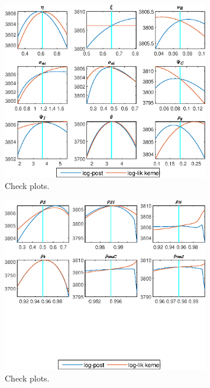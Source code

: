 \begin{figure}[H]
\centering 
\includegraphics[width=0.80\textwidth]{BRS_sectoral_KK/graphs/BRS_sectoral_KK_CheckPlots3}
\caption{Check plots.}\label{Fig:CheckPlots:3}
\end{figure}
 
\begin{figure}[H]
\centering 
\includegraphics[width=0.80\textwidth]{BRS_sectoral_KK/graphs/BRS_sectoral_KK_CheckPlots4}
\caption{Check plots.}\label{Fig:CheckPlots:4}
\end{figure}
 
